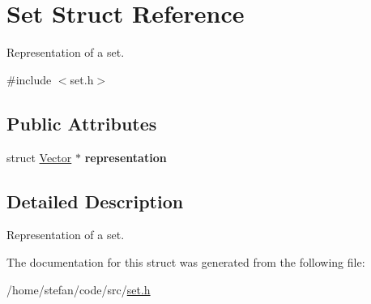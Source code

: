 \hypertarget{structSet}{}\section{Set Struct Reference}
\label{structSet}


Representation of a set.  




{\ttfamily \#include $<$set.\+h$>$}

\subsection*{Public Attributes}
\begin{DoxyCompactItemize}
\item 
\mbox{\label{structSet_adee3ec7b97b7c8907664e41219e58844}} 
struct \hyperlink{structVector}{Vector} $\ast$ {\bfseries representation}
\end{DoxyCompactItemize}


\subsection{Detailed Description}
Representation of a set. 

The documentation for this struct was generated from the following file\+:\begin{DoxyCompactItemize}
\item 
/home/stefan/code/src/\hyperlink{set_8h}{set.\+h}\end{DoxyCompactItemize}
